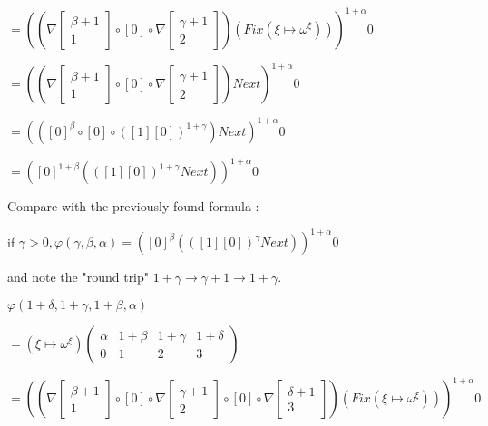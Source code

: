 \documentclass[10pt]{article}
\begin{document}
\( = ((\nabla \begin{bmatrix} \beta+1 \\
                              1       \end{bmatrix} \circ [0] \circ \nabla \begin{bmatrix} \gamma+1 \\
                                                                                           2        \end{bmatrix}) (Fix (\xi \mapsto \omega^\xi)))^{1+\alpha} 0 \)

\( = ((\nabla \begin{bmatrix} \beta+1 \\
                              1       \end{bmatrix} \circ [0] \circ \nabla \begin{bmatrix} \gamma+1 \\
                                                                                           2        \end{bmatrix}) Next)^{1+\alpha} 0 \)

\( = (([0]^\beta  \circ [0] \circ ([1] [0])^{1+\gamma}) Next)^{1+\alpha} 0 \)

\( = ([0]^{1+\beta} (([1] [0])^{1+\gamma} Next))^{1+\alpha} 0 \)

Compare with the previously found formula :

if \( \gamma > 0, \varphi(\gamma,\beta,\alpha) = ([0]^\beta (([1] [0])^\gamma Next))^{1+\alpha} 0 \)

and note the "round trip" \( 1+\gamma \rightarrow \gamma+1 \rightarrow 1+\gamma \).

\bigskip

\( \varphi(1+\delta,1+\gamma,1+\beta,\alpha) \)

\( = (\xi \mapsto \omega^\xi) \begin{pmatrix} \alpha & 1+\beta & 1+\gamma & 1+\delta \\
                                              0      & 1       & 2        & 3        \end{pmatrix} \)

\( = ((\nabla \begin{bmatrix} \beta+1 \\
                              1       \end{bmatrix} \circ [0] \circ \nabla \begin{bmatrix} \gamma+1 \\
                                                                                           2        \end{bmatrix} \circ [0] \circ \nabla \begin{bmatrix} \delta+1 \\
                                                                                                                                                         3        \end{bmatrix}) (Fix (\xi \mapsto \omega^\xi)))^{1+\alpha} 0 \)
\end{document}
